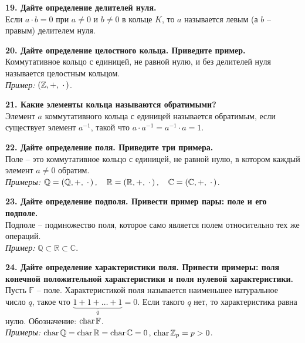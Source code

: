 \documentclass[11pt,a4paper]{article}
\newcommand{\Z}{\mathbb{Z}}
\newcommand{\Q}{\mathbb{Q}}
\newcommand{\R}{\mathbb{R}}
\renewcommand{\C}{\mathbb{C}}
\newcommand{\F}{\mathbb{F}}
\newcommand{\Char}[1]{\mathrm{char}\hspace{0.5mm}#1}
\begin{document}
\textbf{19. Дайте определение делителей нуля.\\}
Если $a \cdot b = 0$ при $a \neq 0$ и $b \neq 0$ в кольце $K$, то $a$ называется левым (а $b$ -- правым) делителем нуля.

\textbf{20. Дайте определение целостного кольца. Приведите пример.\\}
Коммутативное кольцо с единицей, не равной нулю, и без делителей нуля называется целостным кольцом.\\
\textit{Пример:} $\left( \Z, +, \hspace{1mm} \cdot \hspace{0.5mm} \right)$.

\textbf{21. Какие элементы кольца называются обратимыми?\\}
Элемент $a$ коммутативного кольца с единицей называется обратимым, если существует элемент $a^{-1}$, такой что $a \cdot a^{-1} = a^{-1} \cdot a = 1$.

\textbf{22. Дайте определение поля. Приведите три примера.\\}
Поле -- это коммутативное кольцо с единицей, не равной нулю, в котором каждый элемент $a \neq 0$ обратим.\\
\textit{Примеры:} $\Q = \left( \Q, +, \hspace{1mm} \cdot \hspace{0.5mm} \right), \quad \R = \left( \R, +, \hspace{1mm} \cdot \hspace{0.5mm} \right), \quad \C = \left( \C, +, \hspace{1mm} \cdot \hspace{0.5mm} \right)$.

\textbf{23. Дайте определение подполя. Привести пример пары: поле и его подполе.\\}
Подполе -- подмножество поля, которое само является полем относительно тех же операций.\\
\textit{Пример:} $\Q \subset \R \subset \C$.

\textbf{24. Дайте определение характеристики поля. Привести примеры: поля конечной положительной характеристики и поля нулевой характеристики.\\}
Пусть $\F$ -- поле. Характеристикой поля называется наименьшее натуральное число $q$, такое что $\underbrace{1 + 1 + \hdots + 1}_{q} = 0$. Если такого $q$ нет, то характеристика равна нулю. Обозначение: $\Char{\F}$.\\
\textit{Примеры:} $\Char{\Q} = \Char{\R} = \Char{\C} = 0$, $\Char{\Z_p} = p > 0$.
\end{document}
